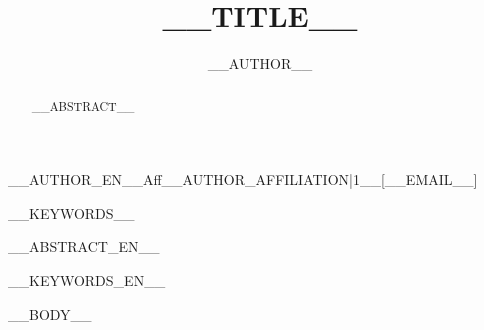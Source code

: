 \documentclass[__CLASSOPTS__]{ipsj}
\begin{document}
\title{__TITLE__}


\author{__AUTHOR__}{__AUTHOR_EN__}{Aff__AUTHOR_AFFILIATION|1__}[__EMAIL__]

\begin{abstract}
__ABSTRACT__
\end{abstract}

\begin{jkeyword}
__KEYWORDS__
\end{jkeyword}

\begin{eabstract}
__ABSTRACT_EN__
\end{eabstract}

\begin{ekeyword}
__KEYWORDS_EN__
\end{ekeyword}

\maketitle

__BODY__



\end{document}
